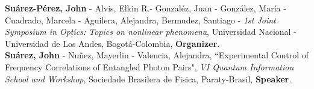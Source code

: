 \documentclass[10pt, a4paper]{article}
\newcommand{\years}[1]{\marginnote{\scriptsize #1}}
\begin{document}


\years{2018}\textbf{Suárez-Pérez, John} - Alvis, Elkin R.- Gonzaléz, Juan - González, María - Cuadrado, Marcela - Aguilera, Alejandra, Bermudez, Santiago - \emph{1st Joint Symposium in Optics: Topics on nonlinear phenomena}, Universidad Nacional - Universidad de Los Andes, Bogotá-Colombia, \textbf{Organizer}.\\



\years{2017}\textbf{Suárez, John} - Nuñez, Mayerlin - Valencia, Alejandra, “Experimental Control of Frequency Correlations of Entangled Photon Pairs", \emph{VI Quantum Information School and Workshop}, Sociedade Brasilera de Fisica, Paraty-Brasil, \textbf{Speaker}.

\end{document}
